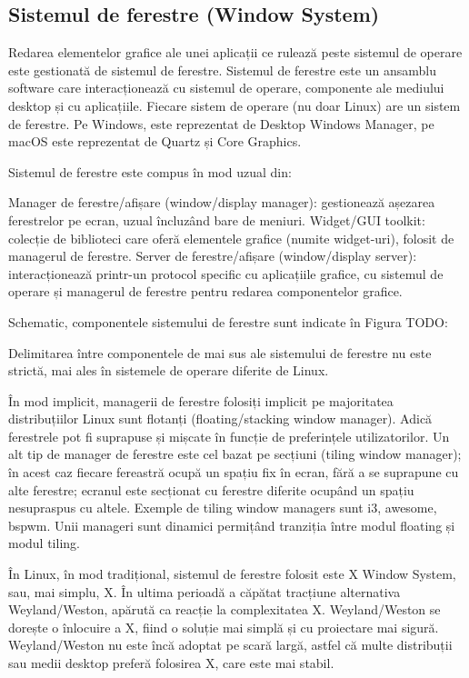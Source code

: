 \subsection{Sistemul de ferestre (Window System)}
\label{sec:ui:window-system}

Redarea elementelor grafice ale unei aplicații ce rulează peste sistemul de operare este gestionată de sistemul de ferestre. Sistemul de ferestre este un ansamblu software care interacționează cu sistemul de operare, componente ale mediului desktop și cu aplicațiile. Fiecare sistem de operare (nu doar Linux) are un sistem de ferestre. Pe Windows, este reprezentat de Desktop Windows Manager, pe macOS este reprezentat de Quartz și Core Graphics.

Sistemul de ferestre este compus în mod uzual din:

Manager de ferestre/afișare (window/display manager): gestionează așezarea ferestrelor pe ecran, uzual încluzând bare de meniuri.
Widget/GUI toolkit: colecție de biblioteci care oferă elementele grafice (numite widget-uri), folosit de managerul de ferestre.
Server de ferestre/afișare (window/display server): interacționează printr-un protocol specific cu aplicațiile grafice, cu sistemul de operare și managerul de ferestre pentru redarea componentelor grafice.

Schematic, componentele sistemului de ferestre sunt indicate în Figura TODO:


Delimitarea între componentele de mai sus ale sistemului de ferestre nu este strictă, mai ales în sistemele de operare diferite de Linux.

În mod implicit, managerii de ferestre folosiți implicit pe majoritatea distribuțiilor Linux sunt flotanți (floating/stacking window manager). Adică ferestrele pot fi suprapuse și mișcate în funcție de preferințele utilizatorilor. Un alt tip de manager de ferestre este cel bazat pe secțiuni (tiling window manager); în acest caz fiecare fereastră ocupă un spațiu fix în ecran, fără a se suprapune cu alte ferestre; ecranul este secționat cu ferestre diferite ocupând un spațiu nesupraspus cu altele. Exemple de tiling window managers sunt i3, awesome, bspwm. Unii manageri sunt dinamici permițând tranziția între modul floating și modul tiling.

În Linux, în mod tradițional, sistemul de ferestre folosit este X Window System, sau, mai simplu, X. În ultima perioadă a căpătat tracțiune alternativa Weyland/Weston, apărută ca reacție la complexitatea X. Weyland/Weston se dorește o înlocuire a X, fiind o soluție mai simplă și cu proiectare mai sigură. Weyland/Weston nu este încă adoptat pe scară largă, astfel că multe distribuții sau medii desktop preferă folosirea X, care este mai stabil.

